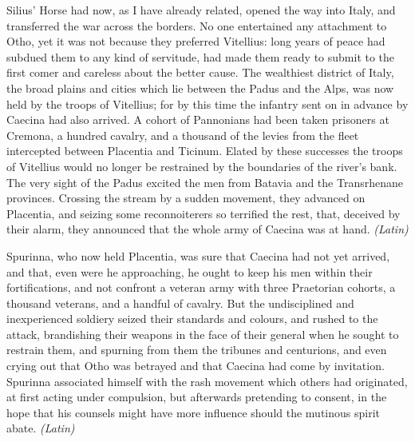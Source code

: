 
Silius' Horse had now, as I have already related, opened the way into Italy, and transferred the war across the borders. No one entertained any attachment to Otho, yet it was not because they preferred Vitellius: long years of peace had subdued them to any kind of servitude, had made them ready to submit to the first comer and careless about the better cause. The wealthiest district of Italy, the broad plains and cities which lie between the Padus and the Alps, was now held by the troops of Vitellius; for by this time the infantry sent on in advance by Caecina had also arrived. A cohort of Pannonians had been taken prisoners at Cremona, a hundred cavalry, and a thousand of the levies from the fleet intercepted between Placentia and Ticinum. Elated by these successes the troops of Vitellius would no longer be restrained by the boundaries of the river's bank. The very sight of the Padus excited the men from Batavia and the Transrhenane provinces. Crossing the stream by a sudden movement, they advanced on Placentia, and seizing some reconnoiterers so terrified the rest, that, deceived by their alarm, they announced that the whole army of Caecina was at hand. \emph{(Latin)}


Spurinna, who now held Placentia, was sure that Caecina had not yet arrived, and that, even were he approaching, he ought to keep his men within their fortifications, and not confront a veteran army with three Praetorian cohorts, a thousand veterans, and a handful of cavalry. But the undisciplined and inexperienced soldiery seized their standards and colours, and rushed to the attack, brandishing their weapons in the face of their general when he sought to restrain them, and spurning from them the tribunes and centurions, and even crying out that Otho was betrayed and that Caecina had come by invitation. Spurinna associated himself with the rash movement which others had originated, at first acting under compulsion, but afterwards pretending to consent, in the hope that his counsels might have more influence should the mutinous spirit abate. \emph{(Latin)}


